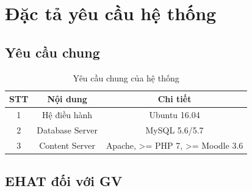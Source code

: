 \newpage
\section{Đặc tả yêu cầu hệ thống}

\subsection{Yêu cầu chung}

\begin{center}
	\begin{table}[!htp]
		\centering
		\begin{tabular}{|c|c|c|}
			\hline 
			STT & Nội dung & Chi tiết \\ 
			\hline 
			1 & Hệ điều hành & Ubuntu 16.04 \\ 
			\hline 
			2 & Database Server & MySQL  5.6/5.7 \\ 
			\hline 
			3 & Content Server & Apache, >= PHP 7, >= Moodle 3.6 \\ 
			\hline 
		\end{tabular} 
		\caption{Yêu cầu chung của hệ thống}
		\label{bang20}
	\end{table}
\end{center}

\subsection{EHAT đối với GV}

